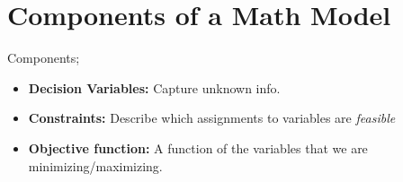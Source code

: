 \documentclass[12pt,oneside]{book} %
\begin{document}
		\section{Components of a Math Model}
		\begin{defn*}
			Components;
			\begin{itemize}
				\item \textbf{Decision Variables: } Capture unknown info.
				\item \textbf{Constraints:} Describe which assignments to variables are \emph{feasible}
				\item \textbf{Objective function: }A function of the variables that we are minimizing/maximizing.
			\end{itemize}

		\end{defn*}
		




\end{document}
